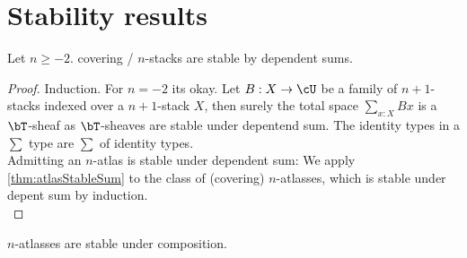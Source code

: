 \section{Stability results}
\begin{theorem}{\label{thm:stabSums}}
	Let $n \ge -2$. covering /  $n$-stacks are stable by dependent sums.
\end{theorem}
\begin{proof}
	Induction.
	For $n = -2$ its okay.    
	Let $B : X \to \cU$ be a family of  $n+1$-stacks indexed over a  $n+1$-stack $X$, then surely the total space $\sum_{x : X} B x$ is a $\bT$-sheaf as $\bT$-sheaves are stable under depentend sum. 
	The identity types in a $\sum$ type are $\sum$ of identity types.\\ 
	Admitting an $n$-atlas is stable under dependent sum: We apply \ref{thm:atlasStableSum} to the class of (covering) $n$-atlasses, which is stable under depent sum by induction.
	\\ %
	
	
\end{proof}
\begin{corollary}{\label{cor:atlascomp}}
	$n$-atlasses are stable under composition.
\end{corollary}
